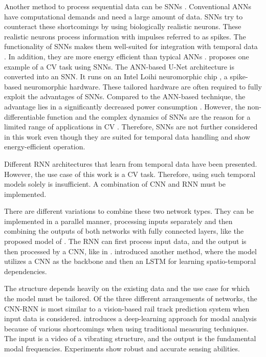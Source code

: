 \noindent Another method to process sequential data can be \ac{SNN}s \cite{spikingNeuralNetworksReview2022}.
Conventional \ac{ANN}s have computational demands and need a large amount of data.
\ac{SNN}s try to counteract these shortcomings by using biologically realistic neurons.
These realistic neurons process information with impulses referred to as spikes.
The functionality of \ac{SNN}s makes them well-suited for integration with temporal data \cite{spikingNeuralNetworksReview2022}.
In addition, they are more energy efficient than typical \ac{ANN}s \cite{spikingNeuralNetworks2019}.
\cite{uNetAsSNN2021} proposes one example of a \ac{CV} task using \ac{SNN}s.
The \ac{ANN}-based U-Net architecture is converted into an \ac{SNN}.
It runs on an Intel Loihi neuromorphic chip \cite{Loihi2018}, a spike-based neuromorphic hardware.
These tailored hardware are often required to fully exploit the advantages of \ac{SNN}s.
Compared to the \ac{ANN}-based technique, the advantage lies in a significantly decreased power consumption \cite{uNetAsSNN2021}.
However, the non-differentiable function and the complex dynamics of \ac{SNN}s are the reason for a limited range of applications in \ac{CV} \cite{spikingNeuralNetworksReview2022} \cite{spikingNeuralNetworks2019}.
Therefore, \ac{SNN}s are not further considered in this work even though they are suited for temporal data handling and show energy-efficient operation.

Different \ac{RNN} architectures that learn from temporal data have been presented.
However, the use case of this work is a \ac{CV} task.
Therefore, using such temporal models solely is insufficient.
A combination of \ac{CNN} and \ac{RNN} must be implemented.

There are different variations to combine these two network types.
They can be implemented in a parallel manner, processing inputs separately and then combining the outputs of both networks with fully connected layers, like the proposed model of \cite{CNNLSTMparallel2021}.
The \ac{RNN} can first process input data, and the output is then processed by a \ac{CNN}, like in \cite{LSTMCNN2022}.
\cite{CNNLSTM2020} introduced another method, where the model utilizes a \ac{CNN} as the backbone and then an \ac{LSTM} for learning spatio-temporal dependencies.

The structure depends heavily on the existing data and the use case for which the model must be tailored.
Of the three different arrangements of networks, the \ac{CNN}-\ac{RNN} \cite{CNNLSTM2020} is most similar to a vision-based rail track prediction system when input data is considered.
\cite{CNNLSTM2020} introduces a deep-learning approach for modal analysis because of various shortcomings when using traditional measuring techniques.
The input is a video of a vibrating structure, and the output is the fundamental modal frequencies.
Experiments show robust and accurate sensing abilities.

